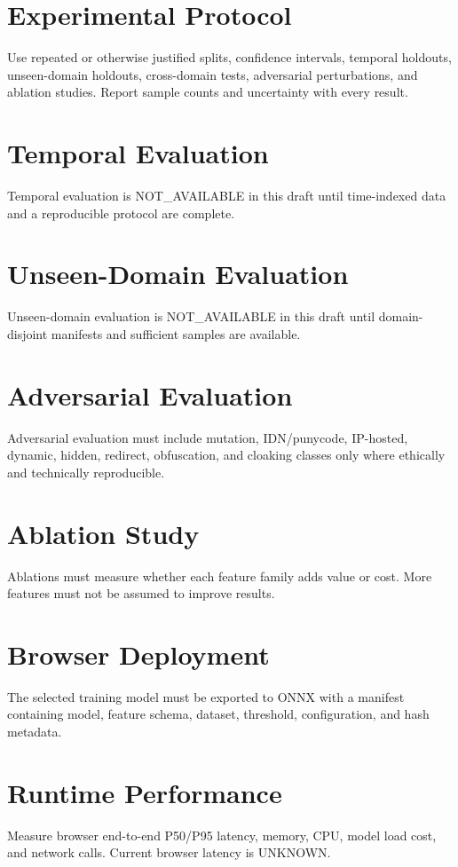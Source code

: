 \documentclass[journal]{IEEEtran}
\begin{document}
\section{Experimental Protocol}
Use repeated or otherwise justified splits, confidence intervals, temporal holdouts, unseen-domain holdouts, cross-domain tests, adversarial perturbations, and ablation studies. Report sample counts and uncertainty with every result.

\section{Temporal Evaluation}
Temporal evaluation is NOT_AVAILABLE in this draft until time-indexed data and a reproducible protocol are complete.

\section{Unseen-Domain Evaluation}
Unseen-domain evaluation is NOT_AVAILABLE in this draft until domain-disjoint manifests and sufficient samples are available.

\section{Adversarial Evaluation}
Adversarial evaluation must include mutation, IDN/punycode, IP-hosted, dynamic, hidden, redirect, obfuscation, and cloaking classes only where ethically and technically reproducible.

\section{Ablation Study}
Ablations must measure whether each feature family adds value or cost. More features must not be assumed to improve results.

\section{Browser Deployment}
The selected training model must be exported to ONNX with a manifest containing model, feature schema, dataset, threshold, configuration, and hash metadata.

\section{Runtime Performance}
Measure browser end-to-end P50/P95 latency, memory, CPU, model load cost, and network calls. Current browser latency is UNKNOWN.
\end{document}
